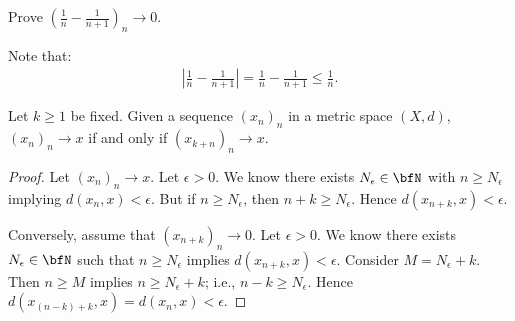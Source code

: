     \begin{example}
        Prove $\left(\frac{1}{n} - \frac{1}{n+1}\right)_n \rightarrow 0$.
    \end{example}
        \begin{solution}
            Note that:
                \begin{equation*}
                \begin{split}
                    \left|\frac{1}{n} - \frac{1}{n+1}\right| = \frac{1}{n} - \frac{1}{n+1} \leq \frac{1}{n}.
                \end{split}
                \end{equation*}
        \end{solution}

    \begin{lemma}
        Let $k \geq 1$ be fixed. Given a sequence $(x_n)_n$ in a metric space $(X,d)$, $(x_n)_n \rightarrow x$ if and only if $(x_{k+n})_n \rightarrow x$.
    \end{lemma}
        \begin{proof}
            Let $(x_n)_n \rightarrow x$. Let $\epsilon >0$. We know there exists $N_\epsilon \in \bfN$ with $n \geq N_\epsilon$ implying $d(x_n , x) < \epsilon$. But if $n\geq N_\epsilon$, then $n+k \geq N_\epsilon$. Hence $d(x_{n+k}, x) < \epsilon$.

            Conversely, assume that $(x_{n+k})_n \rightarrow 0$. Let $\epsilon > 0$. We know there exists $N_\epsilon \in \bfN$ such that $n \geq N_\epsilon$ implies $d(x_{n+k}, x) < \epsilon$. Consider $M = N_\epsilon + k$. Then $n \geq M$ implies $n \geq N_\epsilon + k$; i.e., $n-k \geq N_\epsilon$. Hence $d(x_{(n-k)+k}, x)= d(x_n , x) < \epsilon$.
        \end{proof}
    
